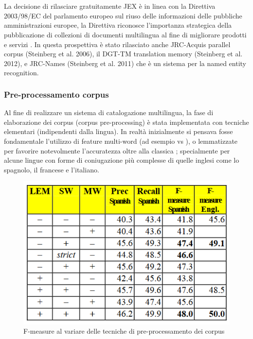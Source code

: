 \documentclass{article}
\theoremstyle{plain}
\theoremstyle{definition}
\begin{document}
\\
\\
La decisione di rilasciare gratuitamente JEX è in linea con la Direttiva 2003/98/EC del parlamento europeo sul riuso delle informazioni delle pubbliche amministrazioni europee, la Direttiva riconosce l'importanza strategica della pubblicazione di collezioni di documenti multilingua al fine di migliorare prodotti e servizi . In questa prospettiva è stato rilasciato anche JRC-Acquis parallel corpus (Steinberg et al. 2006), il DGT-TM translation memory (Steinberg et al. 2012), e JRC-Names (Steinberg et al. 2011) che è un sistema per la named entity recognition.
\subsubsection{Pre-processamento corpus}
Al fine di realizzare un sistema di catalogazione multilingua, la fase di elaborazione dei corpus (corpus pre-processing) è stata implementata con tecniche elementari (indipendenti dalla lingua). In realtà inizialmente si pensava fosse fondamentale l'utilizzo di feature multi-word (ad esempio  vs ), o lemmatizzate per favorire notevolmente l'accuratezza oltre alla classica ; specialmente per alcune lingue con forme di coniugazione più complesse di quelle inglesi come lo spagnolo, il francese e l'italiano. 
\begin{figure}[htbp]
\begin{center}
\includegraphics[scale=1.00]{img/jexfmeasure.png}
\caption{F-measure al variare delle tecniche di pre-processamento dei corpus}
\end{center}
\end{figure}
\end{document}
